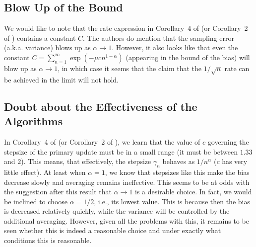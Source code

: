 \documentclass{article}
\begin{document}
\subsection{Blow Up of the Bound}
We would like to note that the rate expression in Corollary~4 of \cite{flstda} (or Corollary~2 of \cite{flstd}) contains a constant $C$. The authors do mention that the sampling error (a.k.a. variance) blows up as $\alpha \rightarrow 1$.
However, it also looks like that even the constant $C=\sum_{n=1}^\infty \exp(-\mu cn^{1-\alpha})$ (appearing in the bound of the bias) will blow up as $\alpha\rightarrow 1$, in which case it seems that the claim that the $1/\sqrt{n}$ rate can be achieved in the limit will not hold.

\subsection{Doubt about the Effectiveness of the Algorithms}
In Corollary~4 of \cite{flstda} (or Corollary~2 of \cite{flstd}), we learn that the value of $c$ governing the stepsize of the primary update must be in a small range (it must be between $1.33$ and $2$). This means, that effectively, the stepsize $\gamma_n$ behaves as $1/n^\alpha$ ($c$ has very little effect). At least when $\alpha=1$, we know that stepsizes like this make the bias decrease slowly and averaging remains ineffective. This seems to be at odds with the suggestion after this result that $\alpha\to 1$ is a desirable choice. In fact, we would be inclined to choose $\alpha=1/2$, i.e., its lowest value. This is because then the bias is decreased relatively quickly, while the variance will be controlled by the additional averaging. However, given all the problems with this, it remains to be seen whether this is indeed a reasonable choice and under exactly what conditions this is reasonable.


%




\end{document}
